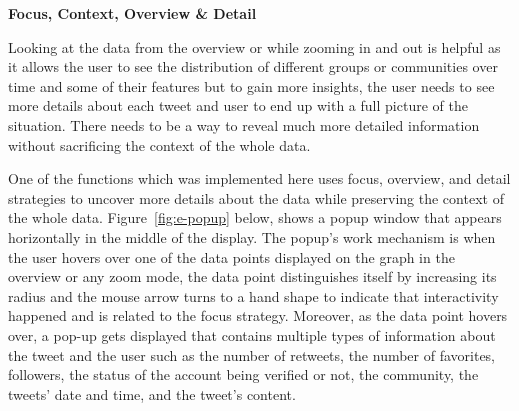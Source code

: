 
\textbf{Focus, Context, Overview \& Detail}

Looking at the data from the overview or while zooming in and out is helpful as it allows the user to see the distribution of different groups or communities over time and some of their features but to gain more insights, the user needs to see more details about each tweet and user to end up with a full picture of the situation. There needs to be a way to reveal much more detailed information without sacrificing the context of the whole data. 


One of the functions which was implemented here uses focus, overview, and detail strategies to uncover more details about the data while preserving the context of the whole data. Figure~\ref{fig:e-popup} below, shows a popup window that appears horizontally in the middle of the display. The popup's work mechanism is when the user hovers over one of the data points displayed on the graph in the overview or any zoom mode, the data point distinguishes itself by increasing its radius and the mouse arrow turns to a hand shape to indicate that interactivity happened and is related to the focus strategy. Moreover, as the data point hovers over, a pop-up gets displayed that contains multiple types of information about the tweet and the user such as the number of retweets, the number of favorites, followers, the status of the account being verified or not, the community, the tweets' date and time, and the tweet's content. 


